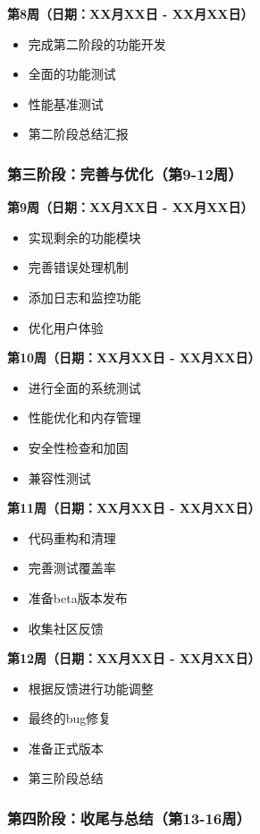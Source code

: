 \documentclass[a4paper,12pt]{article}
\begin{document}
\textbf{第8周（日期：XX月XX日 - XX月XX日）}
\begin{itemize}
    \item 完成第二阶段的功能开发
    \item 全面的功能测试
    \item 性能基准测试
    \item 第二阶段总结汇报
\end{itemize}

\subsubsection{第三阶段：完善与优化（第9-12周）}

\textbf{第9周（日期：XX月XX日 - XX月XX日）}
\begin{itemize}
    \item 实现剩余的功能模块
    \item 完善错误处理机制
    \item 添加日志和监控功能
    \item 优化用户体验
\end{itemize}

\textbf{第10周（日期：XX月XX日 - XX月XX日）}
\begin{itemize}
    \item 进行全面的系统测试
    \item 性能优化和内存管理
    \item 安全性检查和加固
    \item 兼容性测试
\end{itemize}

\textbf{第11周（日期：XX月XX日 - XX月XX日）}
\begin{itemize}
    \item 代码重构和清理
    \item 完善测试覆盖率
    \item 准备beta版本发布
    \item 收集社区反馈
\end{itemize}

\textbf{第12周（日期：XX月XX日 - XX月XX日）}
\begin{itemize}
    \item 根据反馈进行功能调整
    \item 最终的bug修复
    \item 准备正式版本
    \item 第三阶段总结
\end{itemize}

\subsubsection{第四阶段：收尾与总结（第13-16周）}
\end{document}
